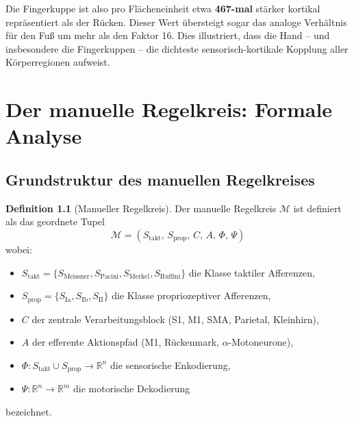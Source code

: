 ﻿\documentclass[12pt,a4paper]{report}
\theoremstyle{plain}
\theoremstyle{definition}
\newtheorem{definition}[theorem]{Definition}
\theoremstyle{remark}
\begin{document}
Die Fingerkuppe ist also pro Flächeneinheit etwa \textbf{467-mal} stärker
kortikal repräsentiert als der Rücken. Dieser Wert übersteigt sogar das
analoge Verhältnis für den Fuß \cite{epp2026feed} um mehr als den Faktor 16.
Dies illustriert, dass die Hand -- und insbesondere die Fingerkuppen --
die dichteste sensorisch-kortikale Kopplung aller Körperregionen aufweist.

\chapter{Der manuelle Regelkreis: Formale Analyse}
\label{chap:regelkreis}

\section{Grundstruktur des manuellen Regelkreises}

\begin{definition}[Manueller Regelkreis]
\label{def:regelkreis}
Der manuelle Regelkreis $\mathcal{M}$ ist definiert als das geordnete
Tupel
\[
  \mathcal{M} = (S_{\text{takt}},\, S_{\text{prop}},\, C,\, A,\, \Phi,\, \Psi)
\]
wobei:
\begin{itemize}
\item $S_{\text{takt}} = \{S_{\mathrm{Meissner}}, S_{\mathrm{Pacini}},
  S_{\mathrm{Merkel}}, S_{\mathrm{Ruffini}}\}$ die Klasse taktiler
  Afferenzen,
\item $S_{\text{prop}} = \{S_{\mathrm{Ia}}, S_{\mathrm{Ib}}, S_{\mathrm{II}}\}$
  die Klasse propriozeptiver Afferenzen,
\item $C$ der zentrale Verarbeitungsblock (S1, M1, SMA, Parietal, Kleinhirn),
\item $A$ der efferente Aktionspfad (M1, Rückenmark, $\alpha$-Motoneurone),
\item $\Phi: S_{\text{takt}} \cup S_{\text{prop}} \to \mathbb{R}^n$
  die sensorische Enkodierung,
\item $\Psi: \mathbb{R}^n \to \mathbb{R}^m$ die motorische Dekodierung
\end{itemize}
bezeichnet.
\end{definition}
\end{document}
